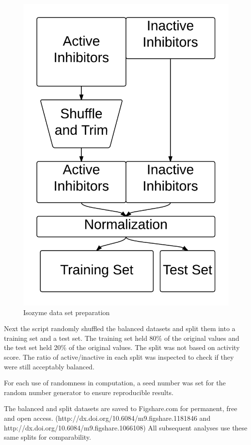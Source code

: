 \begin{figure}[h,t]
  \caption{Isozyme data set preparation}
  \centering
   \includegraphics[width=1\textwidth]{../img/Isozyme_Data_Prep.png}
\end{figure}

Next the script randomly shuffled the balanced datasets and split them into a training set and a test set. The training set held 80\% of the original values and the test set held 20\% of the original values. The split was not based on activity score. The ratio of active/inactive in each split was inspected to check if they were still acceptably balanced.

For each use of randomness in computation, a seed number was set for the random number generator to ensure reproducible results.  

The balanced and split datasets are saved to Figshare.com for permanent, free and open access. (http://dx.doi.org/10.6084/m9.figshare.1181846 and http://dx.doi.org/10.6084/m9.figshare.1066108) All subsequent analyses use these same splits for comparability.

